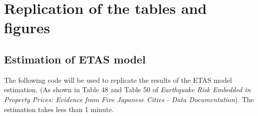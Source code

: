 \documentclass[
]{article}
\begin{document}
\hypertarget{replication-of-the-tables-and-figures}{%
\section{Replication of the tables and
figures}\label{replication-of-the-tables-and-figures}}

\hypertarget{estimation-of-etas-model}{%
\subsection{Estimation of ETAS model}\label{estimation-of-etas-model}}

The following code will be used to replicate the results of the ETAS
model estimation. (As shown in Table 48 and Table 50 of \emph{Earthquake
Risk Embedded in Property Prices: Evidence from Five Japanese Cities -
Data Documentation}). The estimation takes less than 1 minute.
\end{document}
